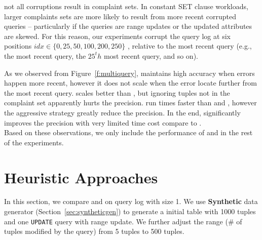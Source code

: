 not all corruptions result in complaint sets.
In constant SET clause workloads, larger complaints sets are more likely to
result from more recent corrupted queries -- particularly if the queries are range updates or
the updated attributes are skewed.
For this reason, our experiments corrupt the query log at six positions 
$idx \in \{0, 25, 50, 100, 200, 250\}$ , relative 
to the most recent query (e.g., the most recent query, the $25^th$ most recent query, and so on).



As we observed from Figure~\ref{f:multiquery}, \milpall maintains high accuracy when errors
happen more recent, however it does not scale when the error locate further from the most
recent query. \milptuple scales better than \milpall, but ignoring tuples not 
in the complaint set apparently hurts the precision. \milptuplestopearly run times faster
than \milpall and \milptuple, however the aggressive strategy greatly reduce the 
precision. In the end, \milpadvtuple significantly improves the precision with very limited
time cost compare to \milptuple. \\
Based on these observations, we only include the performance of \milpadvtuple and \milpadvall
in the rest of the experiments. 


\section{Heuristic Approaches}

In this section, we compare \heurstic and \milpall on query log with size 1. 
We use \textbf{Synthetic} data generator (Section~\ref{sec:syntheticgen}) 
to generate a initial table with 1000 tuples and one 
\texttt{UPDATE} query with range update. 
We further adjust the range (\# of tuples modified by the query) 
from 5 tuples to 500 tuples. 



